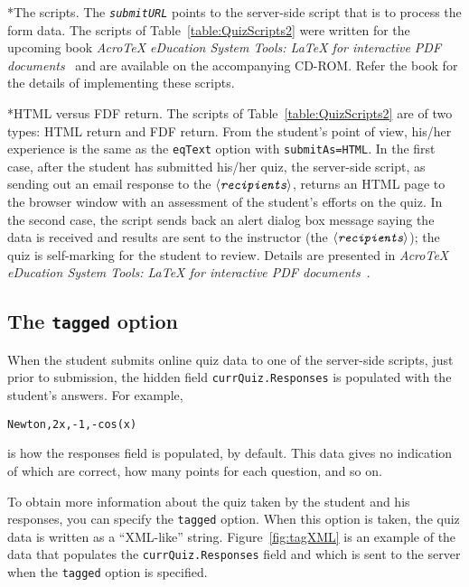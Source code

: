 \documentclass{article}
\makeatletter
\def\AEBBook{\textsl{{Acro\!\TeX} eDucation System Tools: {\LaTeX} for interactive PDF documents}}
\let\bslash=\@backslashchar
\renewcommand{\paragraph}
    {\@startsection{paragraph}{4}{0pt}{6pt}{-3pt}
    {\normalfont\normalsize\bfseries}}
\def\cs#1{\texttt{\bslash#1}}
\def\anglemeta#1{$\langle\textit{\texttt{#1}}\rangle$}
\def\meta#1{\textit{\texttt{#1}}}
\let\opt\texttt
\let\amtIndent\leftmargini
\makeatother
\begin{document}
\paragraph*{The scripts.} The \meta{submitURL} points to the server-side script that is to process the form data.
The scripts of Table~\ref{table:QuizScripts2} were written for the upcoming book
\AEBBook~\cite{book:AEBB} and are available on the accompanying CD-ROM. Refer the book for the details of
implementing these scripts.

\paragraph*{HTML versus FDF return.} The scripts of Table~\ref{table:QuizScripts2} are of two types:
HTML return and FDF return. From the student's point of view, his/her
experience is the same as the \opt{eqText} option with
\texttt{submitAs=HTML}. In the first case, after the student has submitted
his/her quiz, the server-side script, as sending out an email response to the
\anglemeta{recipients}, returns an HTML page to the browser window with an
assessment of the student's efforts on the quiz. In the second case, the
script sends back an alert dialog box message saying the data is received and
results are sent to the instructor (the \anglemeta{recipients}); the quiz is
self-marking for the student to review. Details are presented in \AEBBook~\cite{book:AEBB}.


\subsection{The \texttt{tagged} option}\label{taggedOption}

When the student submits online quiz data to one of the server-side scripts,
just prior to submission, the hidden field \cs{currQuiz.Responses} is
populated with the student's answers. For example,
\begin{Verbatim}[xleftmargin=\amtIndent]
Newton,2x,-1,-cos(x)
\end{Verbatim}
is how the responses field is populated, by default. This data gives no
indication of which are correct, how many points for each question, and so
on.

To obtain more information about the quiz taken by the student and his
responses, you can specify the \opt{tagged} option. When this
option is taken, the quiz data is written as a ``XML-like'' string. Figure~\ref{fig:tagXML} is
an example of the data that populates the \cs{currQuiz.Responses} field and
which is sent to the server when the \opt{tagged} option is specified.
\end{document}

